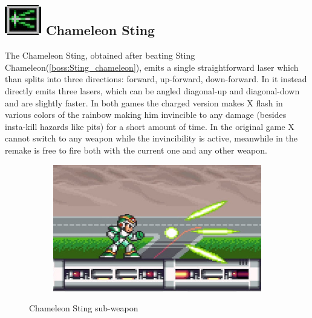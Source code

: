 \subsection{\includegraphics[scale=0.2]{figures/X1/Sting_chameleon/Cham_S.png} Chameleon Sting}\label{Chameleon_sting}
The Chameleon Sting, obtained after beating Sting Chameleon(\ref{boss:Sting_chameleon}), emits a single straightforward laser which than splits into three directions: forward, up-forward, down-forward. In \mhx it instead directly emits three lasers, which can be angled diagonal-up and diagonal-down and are slightly faster. In both games the charged version makes X flash in various colors of the rainbow making him invincible to any damage (besides insta-kill hazards like pits) for a short amount of time. In the original game X cannot switch to any weapon while the invincibility is active, meanwhile in the remake is free to fire both with the current one and any other weapon\cite{wiki:Chameleon_sting}.
\begin{figure}[htp]
	\centering
	\begin{subfigure}{0.35\linewidth}
		\includegraphics[width=\linewidth]{figures/X1/weapons/Chameleon_sting.jpg}
	\end{subfigure}
	\caption{Chameleon Sting sub-weapon}
\end{figure}


